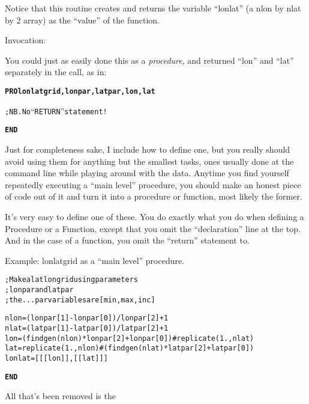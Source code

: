        Notice that this routine creates and returns the variable
       ``lonlat'' (a nlon by nlat by 2 array) as the ``value'' of the
       function.


       Invocation: 

       You could just as easily done this as a \textit{procedure}, and returned
       ``lon'' and ``lat'' separately in the call, as in:


\begin{alltt}
\textbf{PRO lonlatgrid, lonpar, latpar, lon, lat}

 
   ; NB. No ``RETURN'' statement!

\textbf{END}

\end{alltt}

    \item {}

        Just for completeness sake, I include how to define one, but
    you really should avoid using them for anything but the smallest
    tasks, ones usually done at the command line while playing around
    with the data. Anytime you find yourself repeatedly executing a
    ``main level'' procedure, you should make an honest piece of code
    out of it and turn it into a procedure or function, most likely
     the former.

    It's very easy to define one of these. You do exactly what you do
    when defining a Procedure or a Function, except that you omit the
    ``declaration'' line at the top. And in the case of a function,
    you omit the ``return'' statement to.

    Example: lonlatgrid as a ``main level'' procedure.


\begin{alltt}

; Make a latlon grid using parameters 
; lonpar and latpar
; the ...par variables are [min,max,inc]

nlon=(lonpar[1]-lonpar[0])/lonpar[2] +1
nlat=(latpar[1]-latpar[0])/latpar[2] +1
lon = (findgen(nlon)*lonpar[2]+lonpar[0])#replicate(1.,nlat)
lat = replicate(1.,nlon)#(findgen(nlat)*latpar[2]+latpar[0])
lonlat=[ [[lon]], [[lat]] ]

\textbf{END}

\end{alltt}

  All that's been removed is the 


